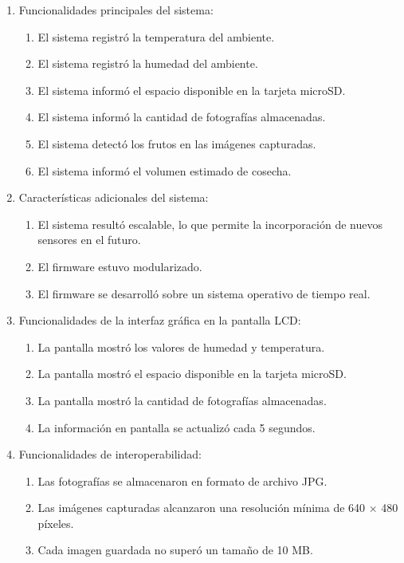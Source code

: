 \begin{enumerate}
	\item Funcionalidades principales del sistema:
		\begin{enumerate}
			\item El sistema registró la temperatura del ambiente.
			\item El sistema registró la humedad del ambiente.
			\item El sistema informó el espacio disponible en la tarjeta microSD.
            \item El sistema informó la cantidad de fotografías almacenadas.
            \item El sistema detectó los frutos en las imágenes capturadas.
            \item El sistema informó el volumen estimado de cosecha.
		\end{enumerate}
	\item Características adicionales del sistema:
		\begin{enumerate}
			\item El sistema resultó escalable, lo que permite la incorporación de nuevos sensores en el futuro.
			\item El firmware estuvo modularizado.
            \item El firmware se desarrolló sobre un sistema operativo de tiempo real.
		\end{enumerate}
    \item Funcionalidades de la interfaz gráfica en la pantalla LCD:
		\begin{enumerate}
			\item La pantalla mostró los valores de humedad y temperatura.
			\item La pantalla mostró el espacio disponible en la tarjeta microSD.
            \item La pantalla mostró la cantidad de fotografías almacenadas.
            \item La información en pantalla se actualizó cada 5 segundos.
		\end{enumerate}
    \item Funcionalidades de interoperabilidad:
		\begin{enumerate}
			\item Las fotografías se almacenaron en formato de archivo JPG.
			\item Las imágenes capturadas alcanzaron una resolución mínima de 640 × 480 píxeles.
            \item Cada imagen guardada no superó un tamaño de 10 MB.
		\end{enumerate}
\end{enumerate}

